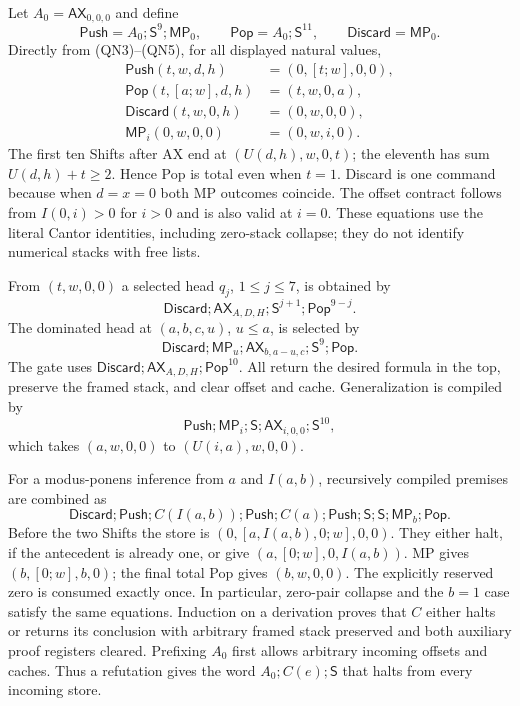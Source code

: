 Let $A_0=\mathsf{AX}_{0,0,0}$ and define
\[
 \mathsf{Push}=A_0;\mathsf S^9;\mathsf{MP}_0,
 \qquad \mathsf{Pop}=A_0;\mathsf S^{11},
 \qquad \mathsf{Discard}=\mathsf{MP}_0.
\]
Directly from (QN3)--(QN5), for all displayed natural values,
\begin{align*}
 \mathsf{Push}(t,w,d,h)&=(0,[t;w],0,0),\\
 \mathsf{Pop}(t,[a;w],d,h)&=(t,w,0,a),\\
 \mathsf{Discard}(t,w,0,h)&=(0,w,0,0),\\
 \mathsf{MP}_i(0,w,0,0)&=(0,w,i,0).
\end{align*}
The first ten Shifts after AX end at $(U(d,h),w,0,t)$; the eleventh
has sum $U(d,h)+t\ge2$. Hence Pop is total even when $t=1$.
Discard is one command because when $d=x=0$ both MP outcomes coincide.
The offset contract follows from $I(0,i)>0$ for $i>0$ and is also valid
at $i=0$. These equations use the literal Cantor identities, including
zero-stack collapse; they do not identify numerical stacks with free lists.

From $(t,w,0,0)$ a selected head $q_j$, $1\le j\le7$, is obtained by
\[
 \mathsf{Discard};\mathsf{AX}_{A,D,H};
       \mathsf S^{j+1};\mathsf{Pop}^{9-j}.
\]
The dominated head at $(a,b,c,u)$, $u\le a$, is selected by
\[
 \mathsf{Discard};\mathsf{MP}_u;
       \mathsf{AX}_{b,a-u,c};\mathsf S^9;\mathsf{Pop}.
\]
The gate uses
$\mathsf{Discard};\mathsf{AX}_{A,D,H};\mathsf{Pop}^{10}$.
All return the desired formula in the top, preserve the framed stack,
and clear offset and cache. Generalization is compiled by
\[
 \mathsf{Push};\mathsf{MP}_i;\mathsf S;
      \mathsf{AX}_{i,0,0};\mathsf S^{10},
\]
which takes $(a,w,0,0)$ to $(U(i,a),w,0,0)$.

For a modus-ponens inference from $a$ and $I(a,b)$, recursively compiled
premises are combined as
\[
 \mathsf{Discard};\mathsf{Push};C(I(a,b));\mathsf{Push};
 C(a);\mathsf{Push};\mathsf S;\mathsf S;
       \mathsf{MP}_b;\mathsf{Pop}.                    \tag{QN6}
\]
Before the two Shifts the store is
$(0,[a,I(a,b),0;w],0,0)$. They either halt, if the antecedent is already
one, or give $(a,[0;w],0,I(a,b))$. MP gives $(b,[0;w],b,0)$;
the final total Pop gives $(b,w,0,0)$. The explicitly reserved zero is
consumed exactly once. In particular, zero-pair collapse and the
$b=1$ case satisfy the same equations.
Induction on a derivation proves that $C$ either halts or returns its
conclusion with arbitrary framed stack preserved and both auxiliary proof
registers cleared. Prefixing $A_0$ first allows arbitrary incoming offsets
and caches. Thus a refutation gives the word $A_0;C(e);\mathsf S$ that
halts from every incoming store.

